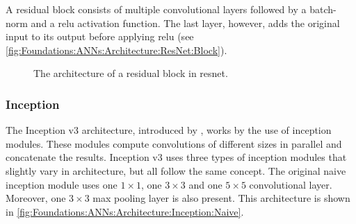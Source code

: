 A residual block consists of multiple convolutional layers followed by a \ac{batch-norm} and a \ac{relu} activation function. The last layer, however, adds the original input to its output before applying \ac{relu} (see \autoref{fig:Foundations:ANNs:Architecture:ResNet:Block}).

\begin{figure}
    \centering
    \caption{The architecture of a residual block in \acs*{resnet}.}
    \label{fig:Foundations:ANNs:Architecture:ResNet:Block}
\end{figure}


\subsubsection{Inception}
\label{sec:Foundations:NeuralNetworks:Architecture:Inception}

The Inception v3 architecture, introduced by \textcite{szegedy2016rethinking}, works by the use of inception modules. These modules compute convolutions of different sizes in parallel and concatenate the results. Inception v3 uses three types of inception modules that slightly vary in architecture, but all follow the same concept. The original naive inception module uses one $1 \times 1$, one $3 \times 3$ and one $5 \times 5$ convolutional layer. Moreover, one $3 \times 3$ max pooling layer is also present. This architecture is shown in \autoref{fig:Foundations:ANNs:Architecture:Inception:Naive}.

